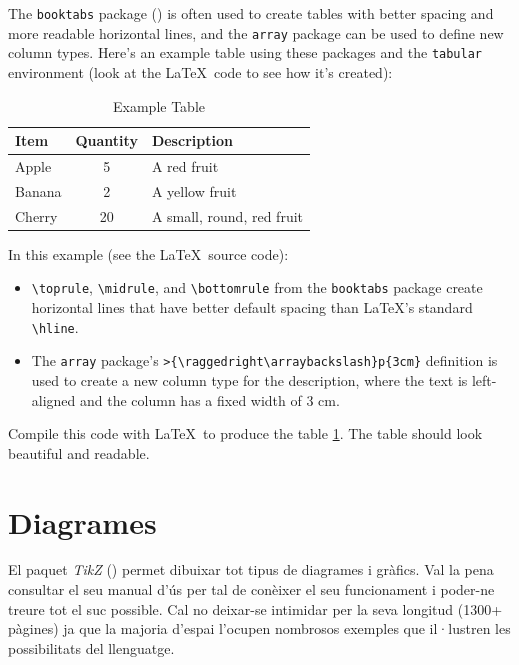   The \texttt{booktabs} package (\cite{booktabs}) is often used to create tables with better spacing and more readable horizontal lines, and the \texttt{array} package can be used to define new column types. Here's an example table using these packages and the \texttt{tabular} environment (look at the \LaTeX\ code to see how it's created):
  
  \begin{table}[h]
    \centering
    \caption{Example Table}\label{tbl:table1}
    \begin{tabular}{@{} l c >{\raggedright\arraybackslash}p{5cm} @{}}
      \toprule
      Item & Quantity & Description \\
      \midrule
      Apple & 5 & A red fruit \\
      Banana & 2 & A yellow fruit \\
      Cherry & 20 & A small, round, red fruit \\
      \bottomrule
    \end{tabular}
  \end{table}
  
  In this example (see the \LaTeX\ source code):
  
  \begin{itemize}
    \item \verb|\toprule|, \verb|\midrule|, and \verb|\bottomrule| from the \texttt{booktabs} package create horizontal lines that have better default spacing than LaTeX's standard \verb|\hline|.

    \item The \texttt{array} package's \verb|>{\raggedright\arraybackslash}p{3cm}| definition is used to create a new column type for the description, where the text is left-aligned and the column has a fixed width of 3 cm.
  \end{itemize}
  
  Compile this code with \LaTeX\ to produce the table \ref{tbl:table1}. The table should look beautiful and readable.
\fi

\ifcase\doclanguage\or
  \section{Diagrames}
    El paquet \textit{TikZ} (\cite{tikz}) permet dibuixar tot tipus de diagrames i gràfics. Val la pena consultar el seu manual d'ús per tal de conèixer el seu funcionament i poder-ne treure tot el suc possible. Cal no deixar-se intimidar per la seva longitud (1300+ pàgines) ja que la majoria d'espai l'ocupen nombrosos exemples que il·lustren les possibilitats del llenguatge.
    
